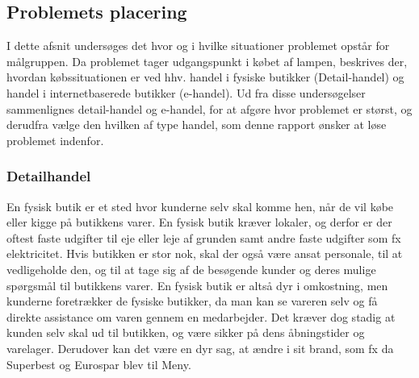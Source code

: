 \subsection{Problemets placering}
I dette afsnit undersøges det hvor og i hvilke situationer problemet opstår for målgruppen. Da problemet tager udgangspunkt i købet af lampen, beskrives der, hvordan købssituationen er ved hhv. handel i fysiske butikker (Detail-handel) og handel i internetbaserede butikker (e-handel). Ud fra disse undersøgelser sammenlignes detail-handel og e-handel, for at afgøre hvor problemet er størst, og derudfra vælge den hvilken af type handel, som denne rapport ønsker at løse problemet indenfor.

\subsubsection{Detailhandel}
En fysisk butik er et sted hvor kunderne selv skal komme hen, når de vil købe eller kigge på butikkens varer. En fysisk butik kræver lokaler, og derfor er der oftest faste udgifter til eje eller leje af grunden samt andre faste udgifter som fx elektricitet. Hvis butikken er stor nok, skal der også være ansat personale, til at vedligeholde den, og til at tage sig af de besøgende kunder og deres mulige spørgsmål til butikkens varer. En fysisk butik er altså dyr i omkostning, men kunderne foretrækker de fysiske butikker, da man kan se vareren selv og få direkte assistance om varen gennem en medarbejder. Det kræver dog stadig at kunden selv skal ud til butikken, og være sikker på dens åbningstider og varelager. Derudover kan det være en dyr sag, at ændre i sit brand, som fx da Superbest og Eurospar blev til Meny.

